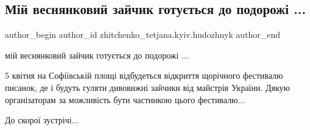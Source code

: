  
 
 
 
 

\subsection{Мій веснянковий зайчик готується до подорожі ...}
\label{sec:30_03_2018.fb.zhitchenko_tetjana.kyiv.hudozhnyk.1.mij_vesnjanyj_zajchyk_gotuetsja_do_podorozhi}

\ifcmt
 author_begin
   author_id zhitchenko_tetjana.kyiv.hudozhnyk
 author_end
\fi

мій веснянковий зайчик готується до подорожі ...

5 квітня на Софіївській площі відбудеться відкриття щорічного фестивалю
писанок, де і будуть гуляти дивовижні зайчики від майстрів України. Дякую
організаторам за можливість бути частинкою цього фестивалю...

До скорої зустрічі...

